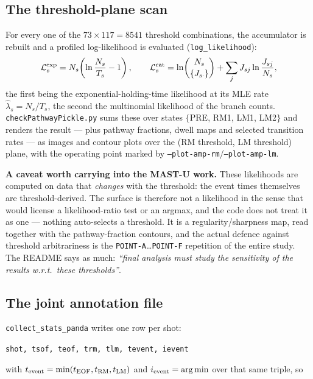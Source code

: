 \documentclass[11pt,a4paper]{article}
\newcommand{\code}[1]{\texttt{\small #1}}
\begin{document}
\subsection{The threshold-plane scan}

For every one of the $73\times117 = 8541$ threshold combinations, the accumulator is rebuilt and a
profiled log-likelihood is evaluated (\code{log\_likelihood}):
\begin{equation}
\mathcal{L}^{\rm exp}_s = N_s\!\left(\ln\frac{N_s}{T_s} - 1\right),
\qquad
\mathcal{L}^{\rm cat}_s = \ln\!\binom{N_s}{\{J_{s\cdot}\}} + \sum_j J_{sj}\ln\frac{J_{sj}}{N_s},
\end{equation}
the first being the exponential-holding-time likelihood at its MLE rate $\hat\lambda_s = N_s/T_s$,
the second the multinomial likelihood of the branch counts. \code{checkPathwayPickle.py} sums these
over states $\{$PRE, RM1, LM1, LM2$\}$ and renders the result --- plus pathway fractions, dwell
maps and selected transition rates --- as images and contour plots over the
(RM threshold, LM threshold) plane, with the operating point marked by
\code{--plot-amp-rm}/\code{--plot-amp-lm}.

\medskip
\noindent\textbf{A caveat worth carrying into the MAST-U work.} These likelihoods are computed on
data that \emph{changes} with the threshold: the event times themselves are threshold-derived. The
surface is therefore not a likelihood in the sense that would license a likelihood-ratio test or an
argmax, and the code does not treat it as one --- nothing auto-selects a threshold. It is a
regularity/sharpness map, read together with the pathway-fraction contours, and the actual defence
against threshold arbitrariness is the \code{POINT-A}\dots\code{POINT-F} repetition of the entire
study. The README says as much: \emph{``final analysis must study the sensitivity of the results
w.r.t.\ these thresholds''}.

\subsection{The joint annotation file}

\code{collect\_stats\_panda} writes one row per shot:

\begin{center}
\code{shot, tsof, teof, trm, tlm, tevent, ievent}
\end{center}

with $t_{\rm event} = \min(t_{\rm EOF}, t_{\rm RM}, t_{\rm LM})$ and
$i_{\rm event} = \arg\min$ over that same triple, so
\end{document}
